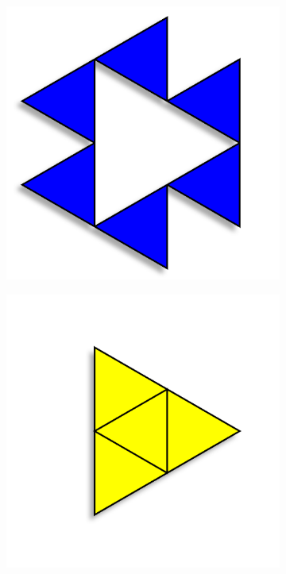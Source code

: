 \documentclass{article}
\begin{document}
\begin{figure}[H]
\begin{subfigure}[b]{0.1\textwidth}
    \end{subfigure}
    \begin{subfigure}[b]{0.1\textwidth}
        \centering
        \includegraphics[width=.9\textwidth]{graphics/behavior/center-columns/blue.png}
    \end{subfigure}
    \begin{subfigure}[b]{0.1\textwidth}
        \centering
        \includegraphics[width=.9\textwidth]{graphics/behavior/center-columns/yellow.png}

\end{subfigure}
\end{figure}
\end{document}
